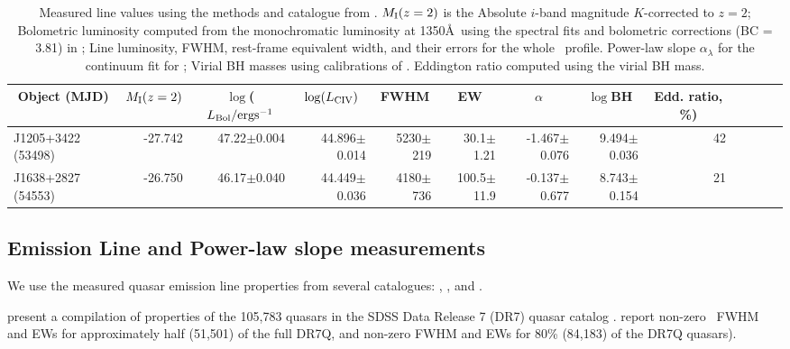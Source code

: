 \documentclass[a4paper,fleqn,usenatbib]{mnras}
\begin{document}
\begin{table}
\begin{tabular}{ l rrr rrr rrr rrr}
\hline
\hline
  \multicolumn{1}{c}{Object (MJD)} &
  \multicolumn{1}{c}{$M_{\rm I}(z=2)$} &
  \multicolumn{1}{c}{$\log$($L_{\rm Bol} / {\rm erg s}^{-1}$} &
  \multicolumn{1}{c}{$\log(L_{\rm CIV})$} &
  \multicolumn{1}{c}{FWHM} &
  \multicolumn{1}{c}{EW} &
  \multicolumn{1}{c}{$\alpha$} &
  \multicolumn{1}{c}{$\log$BH } &
  \multicolumn{1}{c}{Edd. ratio, \%)} \\
\hline
  J1205+3422 (53498)   & 
  -27.742                      & 47.22$\pm$0.004    &    %
44.896$\pm$0.014     &   5230$\pm$219          & 30.1$\pm$1.21        &  -1.467$\pm$0.076    &  %
  9.494$\pm$0.036    &  42 \\
 J1638+2827 (54553)   & 
 -26.750                      & 46.17$\pm$0.040    & %
44.449$\pm$0.036    &  4180$\pm$736          & 100.5$\pm$11.9      & -0.137$\pm$0.677    &   %
  8.743$\pm$0.154     & 21  \\
\hline
\hline
\end{tabular}
 \caption{
Measured line values using the methods and catalogue from
\citet{Shen2011}.  $M_{\rm I}(z=2)$ is the Absolute $i$-band magnitude
$K$-corrected to $z = 2$; Bolometric luminosity computed from the
monochromatic luminosity at 1350\AA\ using the spectral fits and
bolometric corrections (BC = 3.81) in \citet{Richards2006b}; Line
luminosity, FWHM, rest-frame equivalent width, and their errors for
the whole \civ\ profile.  Power-law slope $\alpha_{\lambda}$ for the
continuum fit for \civ; Virial BH masses using calibrations of
\citet{VestergaardPeterson2006}.  Eddington ratio computed using the
virial BH mass.
}
 \label{tab:Shen11_lines}
\end{table}


\subsection{Emission Line and Power-law slope measurements}
We use the measured quasar emission line properties from several catalogues: 
\citet{Shen2011}, \citet{Hamann2017}, \citet{Kozlowski2017} and
\citet{Calderone2017}.

\citet{Shen2011} present a compilation of properties of the 105,783
quasars in the SDSS Data Release 7 (DR7) quasar catalog \citep[DR7Q;
][]{Schneider2007}. \citet{Shen2011} report non-zero \civ\ FWHM and
EWs for approximately half (51,501) of the full DR7Q, and non-zero
\mgii FWHM and EWs for 80\% (84,183) of the DR7Q quasars).
\end{document}
